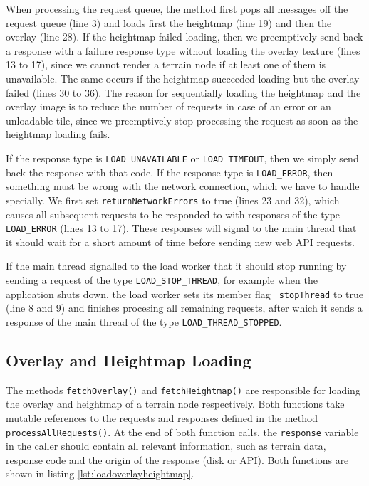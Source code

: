 When processing the request queue, the method first 
pops all messages off the request queue (line 3) and loads first 
the heightmap (line 19) and then the overlay (line 28).
If the heightmap failed loading, then we preemptively 
send back a response with a failure response type without 
loading the overlay texture (lines 13 to 17), since we cannot render 
a terrain node if at least one of them is unavailable. The same 
occurs if the heightmap succeeded loading but 
the overlay failed (lines 30 to 36).
The reason for sequentially loading the heightmap 
and the overlay image is to reduce the number 
of requests in case of an error or an unloadable tile,
since we preemptively stop processing the request 
as soon as the heightmap loading fails.

If the response type is \texttt{LOAD\_UNAVAILABLE} or 
\texttt{LOAD\_TIMEOUT},
then we simply send back the response with that code.
If the response type is \texttt{LOAD\_ERROR},
then something must be wrong with the network connection,
which we have to handle specially. We first 
set \texttt{returnNetworkErrors} to true (lines 23 and 32),
which causes all subsequent requests to be 
responded to with responses of the type \texttt{LOAD\_ERROR} (lines 13 to 17).
These responses will signal to the main thread that 
it should wait for a short amount of time before 
sending new web API requests. 

If the main thread signalled to the load worker that it should stop 
running by sending a request of the type \texttt{LOAD\_STOP\_THREAD}, for example when the application shuts down, 
the load worker sets its member flag \texttt{\_stopThread} to true (line 8 and 9)
and finishes procesing all remaining requests,
after which it sends a response of the main thread 
of the type \texttt{LOAD\_THREAD\_STOPPED}.

\subsection{Overlay and Heightmap Loading}
The methods \texttt{fetchOverlay()} and \texttt{fetchHeightmap()}
are responsible for loading the overlay and heightmap of a terrain node respectively.
Both functions take mutable references to 
the requests and responses defined in the method \texttt{processAllRequests()}.
At the end of both function calls, the \texttt{response} variable in the caller 
should contain all relevant information, such as terrain data, 
response code and the origin of the response (disk or API).
Both functions are shown in listing \ref{lst:loadoverlayheightmap}.


